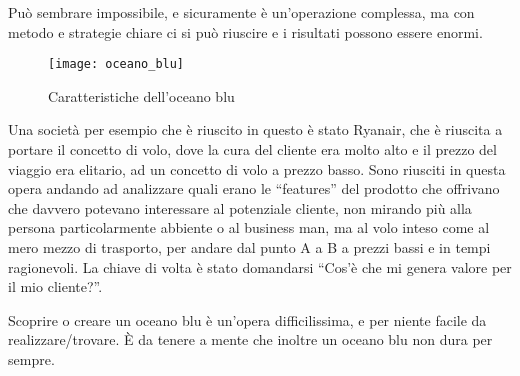 Può sembrare impossibile, e sicuramente è un'operazione complessa, ma con
metodo e strategie chiare ci si può riuscire e i risultati possono essere
enormi.

\begin{figure}[t]
 \centering
 \texttt{[image: oceano\_blu]}
 \caption{Caratteristiche dell'oceano blu}
 \label{fig:bmi:oceano_blu}
\end{figure}

Una società per esempio che è riuscito in questo è stato Ryanair, che è
riuscita a portare il concetto di volo, dove la cura del cliente era molto alto
e il prezzo del viaggio era elitario, ad un concetto di volo a prezzo basso.
Sono riusciti in questa opera andando ad analizzare quali erano le ``features''
del prodotto che offrivano che davvero potevano interessare al potenziale
cliente, non mirando più alla persona particolarmente abbiente o al business
man, ma al volo inteso come al mero mezzo di trasporto, per andare dal punto A
a B a prezzi bassi e in tempi ragionevoli. La chiave di volta è stato
domandarsi ``Cos'è che mi genera valore per il mio cliente?''.

Scoprire o creare un oceano blu è un'opera difficilissima, e per niente facile
da realizzare/trovare. È da tenere a mente che inoltre un oceano blu non dura
per sempre.
